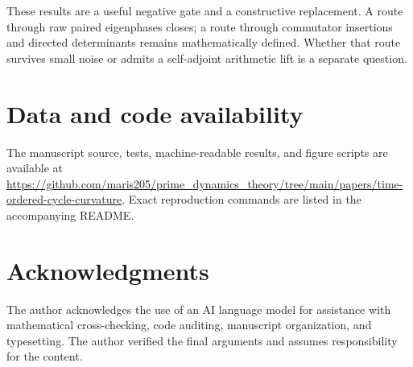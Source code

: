 \documentclass[11pt]{article}
\theoremstyle{definition}
\theoremstyle{remark}
\begin{document}
These results are a useful negative gate and a constructive replacement.  A
route through raw paired eigenphases closes; a route through commutator
insertions and directed determinants remains mathematically defined.  Whether
that route survives small noise or admits a self-adjoint arithmetic lift is a
separate question.

\section*{Data and code availability}

The manuscript source, tests, machine-readable results, and figure scripts are
available at
\url{https://github.com/maris205/prime_dynamics_theory/tree/main/papers/time-ordered-cycle-curvature}.
Exact reproduction commands are listed in the accompanying README.

\section*{Acknowledgments}

The author acknowledges the use of an AI language model for assistance with
mathematical cross-checking, code auditing, manuscript organization, and
typesetting.  The author verified the final arguments and assumes
responsibility for the content.

{\small


}
\end{document}
